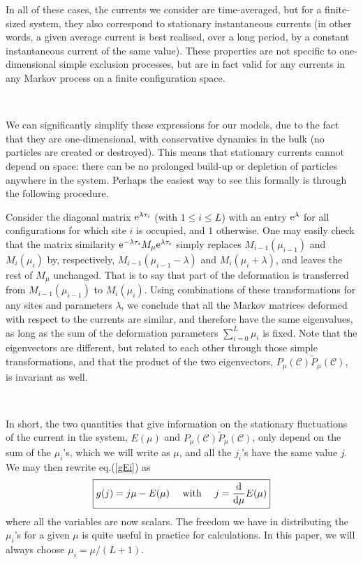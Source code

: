 \documentclass[aps,pre,onecolumn,showpacs,showkeys,a4paper]{revtex4-1}
\begin{document}
In all of these cases, the currents we consider are time-averaged, but for a finite-sized system, they also correspond to stationary instantaneous currents (in other words, a given average current is best realised, over a long period, by a constant instantaneous current of the same value). These properties are not specific to one-dimensional simple exclusion processes, but are in fact valid for any currents in any Markov process on a finite configuration space.

~

We can significantly simplify these expressions for our models, due to the fact that they are one-dimensional, with conservative dynamics in the bulk (no particles are created or destroyed). This means that stationary currents cannot depend on space: there can be no prolonged build-up or depletion of particles anywhere in the system. Perhaps the easiest way to see this formally is through the following procedure.


Consider the diagonal matrix ${\rm e}^{\lambda \tau_i}$ (with $1\leq i\leq L$) with an entry ${\rm e}^{\lambda}$ for all configurations for which site $i$ is occupied, and $1$ otherwise. One may easily check that the matrix similarity ${\rm e}^{-\lambda \tau_i}M_{\mu}{\rm e}^{\lambda \tau_i}$ simply replaces $M_{i-1}(\mu_{i-1})$ and $M_{i}(\mu_{i})$ by, respectively, $M_{i-1}(\mu_{i-1}-\lambda)$ and $M_{i}(\mu_{i}+\lambda)$, and leaves the rest of $M_\mu$ unchanged. That is to say that part of the deformation is transferred from $M_{i-1}(\mu_{i-1})$ to $M_{i}(\mu_{i})$. Using combinations of these transformations for any sites and parameters $\lambda$, we conclude that all the Markov matrices deformed with respect to the currents are similar, and therefore have the same eigenvalues, as long as the sum of the deformation parameters $\sum_{i=0}^{L}\mu_i$ is fixed. Note that the eigenvectors are different, but related to each other through those simple transformations, and that the product of the two eigenvectors, $P_\mu({\mathcal C})\tilde{P}_\mu({\mathcal C})$, is invariant as well.

~

In short, the two quantities that give information on the stationary fluctuations of the current in the system, $E(\mu)$ and $P_\mu({\mathcal C})\tilde{P}_\mu({\mathcal C})$, only depend on the sum of the $\mu_i$'s, which we will write as $\mu$, and all the $j_i$'s have the same value $j$. We may then rewrite eq.(\ref{gEi}) as
\begin{equation}\label{gE}\boxed{
g(j)=j\mu-E(\mu)~~~~{\rm with}~~~~j=\frac{{\rm d}}{{\rm d}\mu} E(\mu)
}\end{equation}
where all the variables are now scalars. The freedom we have in distributing the $\mu_i$'s for a given $\mu$ is quite useful in practice for calculations. In this paper, we will always choose $\mu_i=\mu/(L+1)$.
\end{document}
